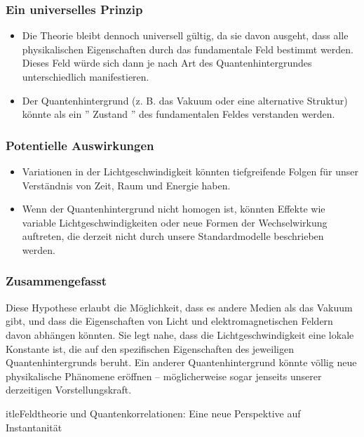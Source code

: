 \documentclass[12pt,a4paper]{article}
\begin{document}
	\subsubsection{Ein universelles Prinzip}
	\begin{itemize}
		\item Die Theorie bleibt dennoch universell gültig, da sie davon ausgeht, dass alle physikalischen Eigenschaften durch das fundamentale Feld bestimmt werden. Dieses Feld würde sich dann je nach Art des Quantenhintergrundes unterschiedlich manifestieren.
		\item Der Quantenhintergrund (z. B. das Vakuum oder eine alternative Struktur) könnte als ein '' Zustand '' des fundamentalen Feldes verstanden werden.
	\end{itemize}
	
	\subsubsection{Potentielle Auswirkungen}
	\begin{itemize}
		\item Variationen in der Lichtgeschwindigkeit könnten tiefgreifende Folgen für unser Verständnis von Zeit, Raum und Energie haben.
		\item Wenn der Quantenhintergrund nicht homogen ist, könnten Effekte wie variable Lichtgeschwindigkeiten oder neue Formen der Wechselwirkung auftreten, die derzeit nicht durch unsere Standardmodelle beschrieben werden.
	\end{itemize}
	
	\subsubsection{Zusammengefasst}
	Diese Hypothese erlaubt die Möglichkeit, dass es andere Medien als das Vakuum gibt, und dass die Eigenschaften von Licht und elektromagnetischen Feldern davon abhängen könnten. Sie legt nahe, dass die Lichtgeschwindigkeit eine lokale Konstante ist, die auf den spezifischen Eigenschaften des jeweiligen Quantenhintergrunds beruht. Ein anderer Quantenhintergrund könnte völlig neue physikalische Phänomene eröffnen – möglicherweise sogar jenseits unserer derzeitigen Vorstellungskraft.
	
	
	
		itle{Feldtheorie und Quantenkorrelationen: Eine neue Perspektive auf Instantanität}
	
	
	\maketitle
	
\end{document}
